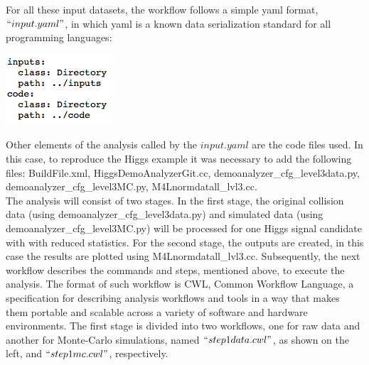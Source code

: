 \documentclass[letter]{article}
\newcommand\tab[1][1cm]{\hspace*{#1}}
\begin{document}
\vspace{20pt}
\hspace{-18pt} For all these input datasets, the workflow follows a simple yaml format,$``input.yaml"$, in which yaml is a known data serialization standard for all programming languages\cite{yaml}:
\begin{center}
\includegraphics[scale=0.6]{inputs}
\end{center}
Other elements of the analysis called by the $input.yaml$ are the code files used. In this case, to reproduce the Higgs example it was necessary to add the following files: 
BuildFile.xml, HiggsDemoAnalyzerGit.cc, demoanalyzer\_cfg\_level3data.py, demoanalyzer\_cfg\_level3MC.py, M4Lnormdatall\_lvl3.cc.\vspace{5pt}
\\ \tab The analysis will consist of two stages. In the first stage, the original collision data (using demoanalyzer\_cfg\_level3data.py) and simulated data (using demoanalyzer\_cfg\_level3MC.py) will be processed for one Higgs signal candidate with with reduced statistics\cite{github}. For the second stage, the outputs are created, in this case the results are plotted using M4Lnormdatall\_lvl3.cc.
Subsequently, the next workflow describes the commands and steps, mentioned above, to execute the analysis. The format of such workflow is CWL\cite{cwl}, Common Workflow Language, a specification for describing analysis workflows and tools in a way that makes them portable and scalable across a variety of software and hardware environments. The first stage is divided into two workflows, one for raw data and another for Monte-Carlo simulations, named $``step1data.cwl"$, as shown on the left, and $``step1mc.cwl"$, respectively.\\ \\
\hspace{-20pt}
\end{document}
